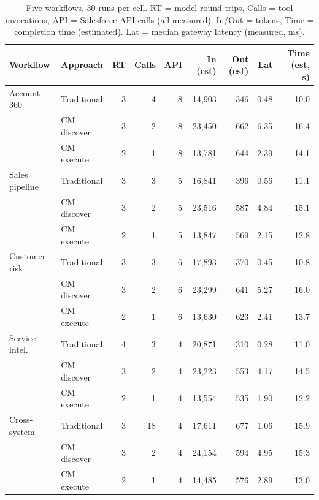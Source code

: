 \documentclass[11pt]{article}
\begin{document}
\begin{table}[t]
\centering\small
\caption{Five workflows, 30 runs per cell. RT = model round trips, Calls = tool invocations, API = Salesforce API calls (all measured). In/Out = tokens, Time = completion time (estimated). Lat = median gateway latency (measured, ms).}
\label{tab:main}
\begin{tabular}{llrrrrrrr}
\toprule
Workflow & Approach & RT & Calls & API & In (est) & Out (est) & Lat & Time (est, s)\\
\midrule
Account 360 & Traditional & 3 & 4 & 8 & 14{,}903 & 346 & 0.48 & 10.0\\
 & CM discover & 3 & 2 & 8 & 23{,}450 & 662 & 6.35 & 16.4\\
 & CM execute & 2 & 1 & 8 & 13{,}781 & 644 & 2.39 & 14.1\\
\midrule
Sales pipeline & Traditional & 3 & 3 & 5 & 16{,}841 & 396 & 0.56 & 11.1\\
 & CM discover & 3 & 2 & 5 & 23{,}516 & 587 & 4.84 & 15.1\\
 & CM execute & 2 & 1 & 5 & 13{,}847 & 569 & 2.15 & 12.8\\
\midrule
Customer risk & Traditional & 3 & 3 & 6 & 17{,}893 & 370 & 0.45 & 10.8\\
 & CM discover & 3 & 2 & 6 & 23{,}299 & 641 & 5.27 & 16.0\\
 & CM execute & 2 & 1 & 6 & 13{,}630 & 623 & 2.41 & 13.7\\
\midrule
Service intel. & Traditional & 4 & 3 & 4 & 20{,}871 & 310 & 0.28 & 11.0\\
 & CM discover & 3 & 2 & 4 & 23{,}223 & 553 & 4.17 & 14.5\\
 & CM execute & 2 & 1 & 4 & 13{,}554 & 535 & 1.90 & 12.2\\
\midrule
Cross-system & Traditional & 3 & 18 & 4 & 17{,}611 & 677 & 1.06 & 15.9\\
 & CM discover & 3 & 2 & 4 & 24{,}154 & 594 & 4.95 & 15.3\\
 & CM execute & 2 & 1 & 4 & 14{,}485 & 576 & 2.89 & 13.0\\
\bottomrule
\end{tabular}
\end{table}
\end{document}
